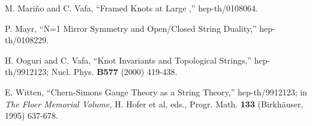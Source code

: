 \documentclass[a4paper,11pt]{article}
\begin{document}
\begin{thebibliography}{99}
 M. Mari\~no and C. Vafa,
``Framed Knots at Large \coordHE{},'' hep-th/0108064.

 P. Mayr,
``N=1 Mirror Symmetry and Open/Closed String Duality,''
hep-th/0108229.

 H. Ooguri and C. Vafa,
``Knot Invariants and Topological Strings,''
hep-th/9912123;
Nucl. Phys. {\bf B577} (2000) 419-438.

 E. Witten,
``Chern-Simons Gauge Theory as a String Theory,''
hep-th/9912123;
in {\em The Floer Memorial Volume,} H. Hofer et al,
eds.,
Progr. Math. {\bf 133} (Birkh\"auser,
1995) 637-678.

\end{thebibliography}
\end{document}
